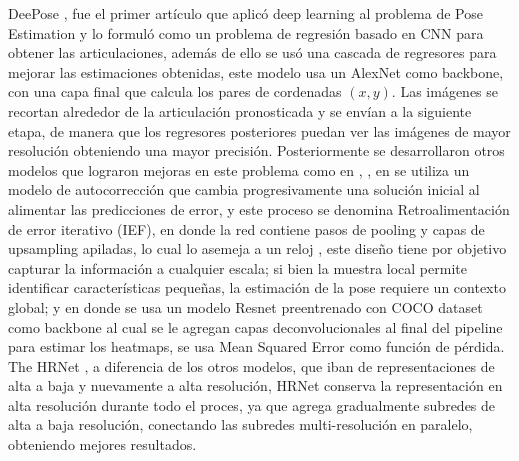 \documentclass[conference]{IEEEtran}
\begin{document}
DeePose \cite{toshev2014deeppose}, fue el primer artículo que aplicó deep learning al problema de Pose Estimation y lo formuló como un problema de regresión basado en CNN para obtener las articulaciones, además de ello se usó una cascada de regresores para mejorar las estimaciones obtenidas, este modelo usa un AlexNet como backbone, con una capa final que calcula los pares de cordenadas $(x, y)$. Las imágenes se recortan alrededor de la articulación pronosticada y se envían a la siguiente etapa, de manera que los regresores posteriores puedan ver las imágenes de mayor resolución obteniendo una mayor precisión. Posteriormente se desarrollaron otros modelos que lograron mejoras en este problema como en \cite{tompson2015efficient} , \cite{wei2016convolutional}, en \cite{carreira2016human} se utiliza un modelo de autocorrección que cambia progresivamente una solución inicial al alimentar las predicciones de error, y este proceso se denomina Retroalimentación de error iterativo (IEF), en \cite{newell2016stacked} donde la red contiene pasos de pooling y capas de upsampling apiladas, lo cual lo asemeja a un reloj , este diseño tiene por objetivo capturar la información a cualquier escala; si bien la muestra local permite identificar características pequeñas, la estimación de la pose requiere un contexto global; y en  \cite{xiao2018simple} donde se usa un modelo Resnet preentrenado con COCO dataset como backbone al cual se le agregan capas deconvolucionales al final del pipeline para estimar los heatmaps, se usa Mean Squared Error como función de pérdida. The HRNet \cite{sun2019deep} , a diferencia de los otros modelos, que iban de representaciones de alta a baja y nuevamente a alta resolución, HRNet conserva la representación en alta resolución durante todo el proces, ya que agrega gradualmente subredes de alta a baja resolución, conectando las subredes multi-resolución en paralelo, obteniendo mejores resultados. 
\end{document}
